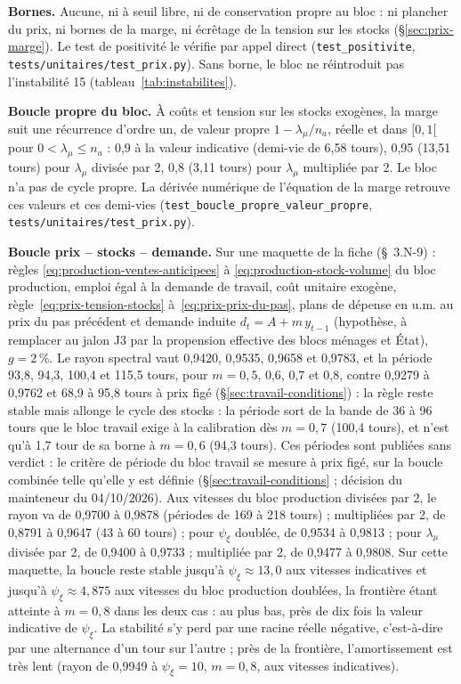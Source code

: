 \documentclass[11pt,a4paper]{article}
\begin{document}
\textbf{Bornes.} Aucune, ni à seuil libre, ni de conservation propre au bloc : ni plancher du prix, ni bornes de la marge, ni écrêtage de la tension sur les stocks (\S\ref{sec:prix-marge}). Le test de positivité le vérifie par appel direct (\nolinkurl{test_positivite}, \nolinkurl{tests/unitaires/test_prix.py}). Sans borne, le bloc ne réintroduit pas l'instabilité 15 (tableau~\ref{tab:instabilites}).

\textbf{Boucle propre du bloc.} À coûts et tension sur les stocks exogènes, la marge suit une récurrence d'ordre un, de valeur propre $1 - \lambda_\mu/n_a$, réelle et dans $[0, 1[$ pour $0 < \lambda_\mu \le n_a$ : 0,9 à la valeur indicative (demi-vie de 6,58 tours), 0,95 (13,51 tours) pour $\lambda_\mu$ divisée par 2, 0,8 (3,11 tours) pour $\lambda_\mu$ multipliée par 2. Le bloc n'a pas de cycle propre. La dérivée numérique de l'équation de la marge retrouve ces valeurs et ces demi-vies (\nolinkurl{test_boucle_propre_valeur_propre}, \nolinkurl{tests/unitaires/test_prix.py}).

\textbf{Boucle prix -- stocks -- demande.} Sur une maquette de la fiche (\S~3.N-9) : règles \eqref{eq:production-ventes-anticipees} à \eqref{eq:production-stock-volume} du bloc production, emploi égal à la demande de travail, coût unitaire exogène, règle~\eqref{eq:prix-tension-stocks} à~\eqref{eq:prix-prix-du-pas}, plans de dépense en u.m. au prix du pas précédent et demande induite $d_t = A + m\,y_{t-1}$ (hypothèse, à remplacer au jalon J3 par la propension effective des blocs ménages et État), $g = 2\,\%$. Le rayon spectral vaut 0,9420, 0,9535, 0,9658 et 0,9783, et la période 93,8, 94,3, 100,4 et 115,5 tours, pour $m = 0{,}5$, 0,6, 0,7 et 0,8, contre 0,9279 à 0,9762 et 68,9 à 95,8 tours à prix figé (\S\ref{sec:travail-conditions}) : la règle reste stable mais allonge le cycle des stocks : la période sort de la bande de 36 à 96 tours que le bloc travail exige à la calibration dès $m = 0{,}7$ (100,4 tours), et n'est qu'à 1,7 tour de sa borne à $m = 0{,}6$ (94,3 tours). Ces périodes sont publiées sans verdict : le critère de période du bloc travail se mesure à prix figé, sur la boucle combinée telle qu'elle y est définie (\S\ref{sec:travail-conditions} ; décision du mainteneur du 04/10/2026). Aux vitesses du bloc production divisées par 2, le rayon va de 0,9700 à 0,9878 (périodes de 169 à 218 tours) ; multipliées par 2, de 0,8791 à 0,9647 (43 à 60 tours) ; pour $\psi_\xi$ doublée, de 0,9534 à 0,9813 ; pour $\lambda_\mu$ divisée par 2, de 0,9400 à 0,9733 ; multipliée par 2, de 0,9477 à 0,9808. Sur cette maquette, la boucle reste stable jusqu'à $\psi_\xi \approx 13{,}0$ aux vitesses indicatives et jusqu'à $\psi_\xi \approx 4{,}875$ aux vitesses du bloc production doublées, la frontière étant atteinte à $m = 0{,}8$ dans les deux cas : au plus bas, près de dix fois la valeur indicative de $\psi_\xi$. La stabilité s'y perd par une racine réelle négative, c'est-à-dire par une alternance d'un tour sur l'autre ; près de la frontière, l'amortissement est très lent (rayon de 0,9949 à $\psi_\xi = 10$, $m = 0{,}8$, aux vitesses indicatives).
\end{document}
